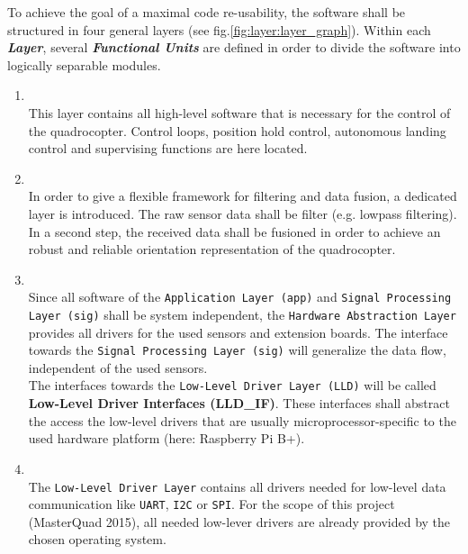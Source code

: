 To achieve the goal of a maximal code re-usability, the software shall be structured in four general layers (see fig.\ref{fig:layer:layer_graph}). Within each \textbf{\textit{Layer}}, several \textbf{\textit{Functional Units}} are defined in order to divide the software into logically separable modules.
\begin{enumerate}
	\item {}\\
				This layer contains all high-level software that is necessary for the control of the quadrocopter. Control loops, position hold control, autonomous landing control and supervising functions are here located.
	\item {}\\
				In order to give a flexible framework for filtering and data fusion, a dedicated layer is introduced. The raw sensor data shall be filter (e.g. lowpass filtering). In a second step, the received data shall be fusioned in order to achieve an robust and reliable orientation representation of the quadrocopter.
	\item {}\\
				Since all software of the \texttt{Application Layer (app)} and \texttt{Signal Processing Layer (sig)} shall be system independent, the \texttt{Hardware Abstraction Layer} provides all drivers for the used sensors and extension boards. The interface towards the \texttt{Signal Processing Layer (sig)} will generalize the data flow, independent of the used sensors.\\
				The interfaces towards the \texttt{Low-Level Driver Layer (LLD)} will be called \textbf{Low-Level Driver Interfaces (LLD\_IF)}. These interfaces shall abstract the access the low-level drivers that are usually microprocessor-specific to the used hardware platform (here: Raspberry Pi B+).
	\item {}\\
				The \texttt{Low-Level Driver Layer} contains all drivers needed for low-level data communication like \texttt{UART}, \texttt{I2C} or \texttt{SPI}. For the scope of this project (MasterQuad 2015), all needed low-lever drivers are already provided by the chosen operating system.
\end{enumerate}

